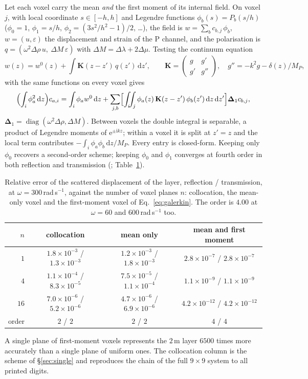 \documentclass[preprint,review,12pt]{elsarticle}
\newcommand{\bK}{\mathbf{K}}
\newcommand{\bD}{\boldsymbol{\Delta}}
\newcommand{\dd}{\mathrm{d}}
\begin{document}
Let each voxel carry the mean \emph{and} the first moment of its internal field. On voxel $j$, with
local coordinate $s\in[-h,h]$ and Legendre functions $\phi_b(s)=P_b(s/h)$ ($\phi_0=1$, $\phi_1=s/h$,
$\phi_2=(3s^2/h^2-1)/2$, \dots), the field is
$w=\sum_{b}c_{b,j}\,\phi_b$, $w=(u,\varepsilon)$ the displacement and strain of the P channel, and
the polarisation is $q=(\omega^2\Delta\rho\,u,\ \Delta M\,\varepsilon)$ with $\Delta M=\Delta\lambda
+2\Delta\mu$. Testing the continuum equation
\begin{equation}
  w(z)=w^0(z)+\int\bK(z-z')\,q(z')\,\dd z',\qquad
  \bK=\begin{pmatrix} g & g' \\ g' & g''\end{pmatrix},\quad g''=-k^2g-\delta(z)/M_P,
\end{equation}
with the same functions on every voxel gives
\begin{equation}\label{eq:galerkin}
  \Bigl(\int_{i}\phi_a^2\,\dd z\Bigr)c_{a,i}
  =\int_i\phi_a w^0\,\dd z+\sum_{j,b}\Bigl[\int_i\!\!\int_j\phi_a(z)\,\bK(z-z')\,\phi_b(z')\,\dd z\,\dd z'\Bigr]
  \bD_1 c_{b,j},
\end{equation}
$\bD_1=\operatorname{diag}(\omega^2\Delta\rho,\Delta M)$. Between voxels the double integral is
separable, a product of Legendre moments of $\mathrm{e}^{\pm \mathrm{i}kz}$; within a voxel it is split at $z'=z$ and
the local term contributes $-\int_i\phi_a\phi_b\,\dd z/M_P$. Every entry is closed-form. Keeping only
$\phi_0$ recovers a second-order scheme; keeping $\phi_0$ and $\phi_1$ converges at fourth order in
both reflection and transmission (; Table~\ref{tab:fourth1d}).
\begin{table}[htbp]
\centering
\caption{Relative error of the scattered displacement of the layer, reflection / transmission, at $\omega=300$\,rad\,s$^{-1}$, against the number of voxel planes $n$: collocation, the mean-only voxel and the first-moment voxel of Eq.~\eqref{eq:galerkin}. The order is $4.00$ at $\omega=60$ and $600$\,rad\,s$^{-1}$ too.}\label{tab:fourth1d}
\begin{tabular}{@{}rccc@{}}
\toprule
$n$ & collocation & mean only & mean and first moment \\
\midrule
$1$  & $1.8\times10^{-3}$ / $1.3\times10^{-3}$ & $1.2\times10^{-3}$ / $1.8\times10^{-3}$ &
       $2.8\times10^{-7}$ / $2.8\times10^{-7}$ \\
$4$  & $1.1\times10^{-4}$ / $8.3\times10^{-5}$ & $7.5\times10^{-5}$ / $1.1\times10^{-4}$ &
       $1.1\times10^{-9}$ / $1.1\times10^{-9}$ \\
$16$ & $7.0\times10^{-6}$ / $5.2\times10^{-6}$ & $4.7\times10^{-6}$ / $6.9\times10^{-6}$ &
       $4.2\times10^{-12}$ / $4.2\times10^{-12}$ \\
order & $2$ / $2$ & $2$ / $2$ & $4$ / $4$ \\
\bottomrule
\end{tabular}
\end{table}
A single plane of first-moment
voxels represents the $2$\,m layer $6500$ times more accurately than a single plane of uniform ones.
The collocation column is the scheme of \S\ref{sec:single} and reproduces the chain of the full
$9\times9$ system to all printed digits.
\end{document}
